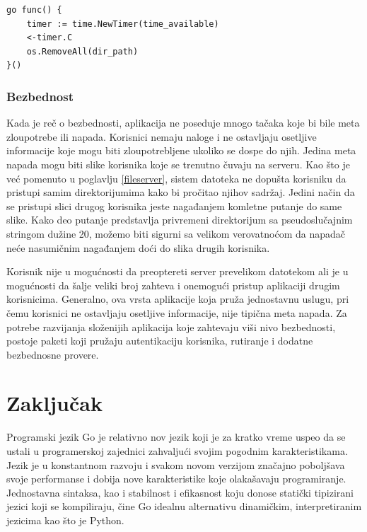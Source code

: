 \documentclass[12pt,oneside]{memoir}
\begin{document}
\begin{center}
\begin{lstlisting}[caption=Gorutina za brisanje privremenih direktorijuma,label={lst:clean},  backgroundcolor=\color{background}]
go func() {
	timer := time.NewTimer(time_available)
	<-timer.C
	os.RemoveAll(dir_path)
}()
\end{lstlisting}
\end{center}


\subsection{Bezbednost}

Kada je reč o bezbednosti, aplikacija ne poseduje mnogo tačaka koje bi bile meta zloupotrebe ili napada. Korisnici nemaju naloge i ne ostavljaju osetljive informacije koje mogu biti zloupotrebljene ukoliko se dospe do njih. Jedina meta napada mogu biti slike korisnika koje se trenutno čuvaju na serveru. Kao što je već pomenuto u poglavlju \ref{fileserver}, sistem datoteka ne dopušta korisniku da pristupi samim direktorijumima kako bi pročitao njihov sadržaj. Jedini način da se pristupi slici drugog korisnika jeste nagađanjem komletne putanje do same slike. Kako deo putanje predstavlja privremeni direktorijum sa pseudoslučajnim stringom dužine 20, možemo biti sigurni sa velikom verovatnoćom da napadač neće nasumičnim nagađanjem doći do slika drugih korisnika. 

Korisnik nije u mogućnosti da preoptereti server prevelikom datotekom ali je u mogućnosti da šalje veliki broj zahteva i onemogući pristup aplikaciji drugim korisnicima. Generalno, ova vrsta aplikacije koja pruža jednostavnu uslugu, pri čemu korisnici ne ostavljaju osetljive informacije, nije tipična meta napada. Za potrebe razvijanja složenijih aplikacija koje zahtevaju viši nivo bezbednosti, postoje paketi koji pružaju autentikaciju korisnika, rutiranje i dodatne bezbednosne provere. 

\chapter{Zaključak}

Programski jezik Go je relativno nov jezik koji je za kratko vreme uspeo da se ustali u programerskoj zajednici zahvaljući svojim pogodnim karakteristikama. Jezik je u konstantnom razvoju i svakom novom verzijom značajno poboljšava svoje performanse i dobija nove karakteristike koje olakašavaju programiranje. Jednostavna sintaksa, kao i stabilnost i efikasnost koju donose statički tipizirani jezici koji se kompiliraju, čine Go idealnu alternativu dinamičkim, interpretiranim jezicima kao što je Python.
\end{document}
